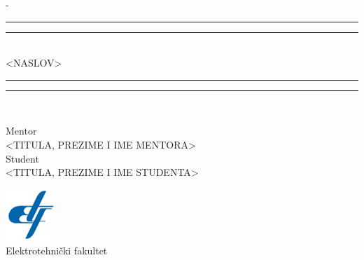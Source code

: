%
%
% 
%
%
\begin{titlingpage}
\begin{SingleSpace}
\calccentering{\unitlength} 
\begin{adjustwidth*}{\unitlength}{-\unitlength}
\vspace*{13mm}
\begin{center}
\rule[0.5ex]{\linewidth}{2pt}\vspace*{-\baselineskip}\vspace*{3.2pt}
\rule[0.5ex]{\linewidth}{1pt}\\[\baselineskip]
{\HUGE <NASLOV>  }\\[4mm]
\rule[0.5ex]{\linewidth}{1pt}\vspace*{-\baselineskip}\vspace{3.2pt}
\rule[0.5ex]{\linewidth}{2pt}\\
\vspace{6.5mm}
\begin{multicols}{2}
\large Mentor \\  \textsc{<TITULA, PREZIME I IME MENTORA>} \\
\vspace{6.5mm}
\large Student \\ \textsc{<TITULA, PREZIME I IME STUDENTA>}
\end{multicols}
\vspace{11mm}
\includegraphics[scale=1]{images/etf-logo.png}\\
\vspace{6mm}
{\large Elektrotehnički fakultet\\
}
\end{center}
\end{adjustwidth*}
\end{SingleSpace}
\end{titlingpage}
